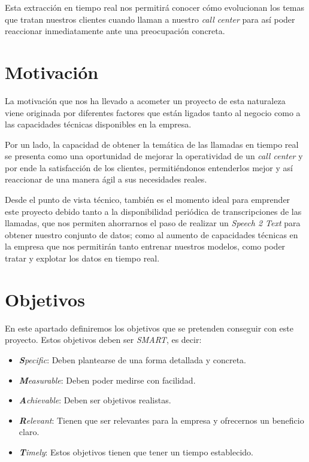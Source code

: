 Esta extracción en tiempo real nos permitirá conocer cómo evolucionan los temas que tratan nuestros clientes cuando llaman a nuestro \textit{call center} para así poder reaccionar inmediatamente ante una preocupación concreta. 


\section{Motivación}
\label{section:intro:motivacion}
La motivación que nos ha llevado a acometer un proyecto de esta naturaleza viene originada por diferentes factores que están ligados tanto al negocio como a las capacidades técnicas disponibles en la empresa. 

Por un lado, la capacidad de obtener la temática de las llamadas en tiempo real se presenta como una oportunidad de mejorar la operatividad de un \textit{call center} y por ende la satisfacción de los clientes, permitiéndonos entenderlos mejor y así reaccionar de una manera ágil a sus necesidades reales.

Desde el punto de vista técnico, también es el momento ideal para emprender este proyecto debido tanto a la disponibilidad periódica de transcripciones de las llamadas, que nos permiten ahorrarnos el paso de realizar un \textit{Speech 2 Text} para obtener nuestro conjunto de datos; como al aumento de capacidades técnicas en la empresa que nos permitirán tanto entrenar nuestros modelos, como poder tratar y explotar los datos en tiempo real. 


\section{Objetivos}
\label{section:intro:objetivos}
En este apartado definiremos los objetivos que se pretenden conseguir con este proyecto. Estos objetivos deben ser \textit{SMART}, es decir: 

\begin{itemize}
	\item \textit{\textbf{S}pecific}: Deben plantearse de una forma detallada y concreta.
	\item \textit{\textbf{M}easurable}: Deben poder medirse con facilidad.
	\item \textit{\textbf{A}chievable}: Deben ser objetivos realistas.
	\item \textit{\textbf{R}elevant}: Tienen que ser relevantes para la empresa y ofrecernos un beneficio claro.
	\item  \textit{\textbf{T}imely}: Estos objetivos tienen que tener un tiempo establecido.
\end{itemize}





